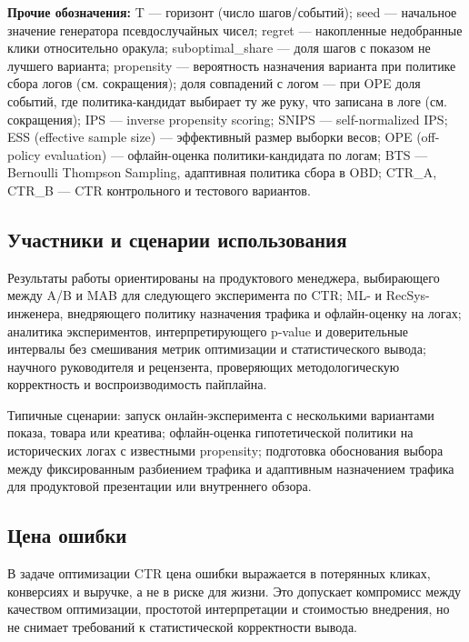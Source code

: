 \textbf{Прочие обозначения:} T --- горизонт (число шагов/событий); seed --- начальное значение генератора псевдослучайных чисел; regret --- накопленные недобранные клики относительно оракула; suboptimal\_share --- доля шагов с показом не лучшего варианта; propensity --- вероятность назначения варианта при политике сбора логов (см. сокращения); доля совпадений с логом --- при OPE доля событий, где политика-кандидат выбирает ту же руку, что записана в логе (см. сокращения); IPS --- inverse propensity scoring; SNIPS --- self-normalized IPS; ESS (effective sample size) --- эффективный размер выборки весов; OPE (off-policy evaluation) --- офлайн-оценка политики-кандидата по логам; BTS --- Bernoulli Thompson Sampling, адаптивная политика сбора в OBD; CTR\_A, CTR\_B --- CTR контрольного и тестового вариантов.

\subsection{Участники и сценарии использования}\label{ux443ux447ux430ux441ux442ux43dux438ux43aux438-ux438-ux441ux446ux435ux43dux430ux440ux438ux438-ux438ux441ux43fux43eux43bux44cux437ux43eux432ux430ux43dux438ux44f}

Результаты работы ориентированы на продуктового менеджера, выбирающего между A/B и MAB для следующего эксперимента по CTR; ML- и RecSys-инженера, внедряющего политику назначения трафика и офлайн-оценку на логах; аналитика экспериментов, интерпретирующего p-value и доверительные интервалы без смешивания метрик оптимизации и статистического вывода; научного руководителя и рецензента, проверяющих методологическую корректность и воспроизводимость пайплайна.

Типичные сценарии: запуск онлайн-эксперимента с несколькими вариантами показа, товара или креатива; офлайн-оценка гипотетической политики на исторических логах с известными propensity; подготовка обоснования выбора между фиксированным разбиением трафика и адаптивным назначением трафика для продуктовой презентации или внутреннего обзора.

\subsection{Цена ошибки}\label{ux446ux435ux43dux430-ux43eux448ux438ux431ux43aux438}

В задаче оптимизации CTR цена ошибки выражается в потерянных кликах, конверсиях и выручке, а не в риске для жизни. Это допускает компромисс между качеством оптимизации, простотой интерпретации и стоимостью внедрения, но не снимает требований к статистической корректности вывода.

